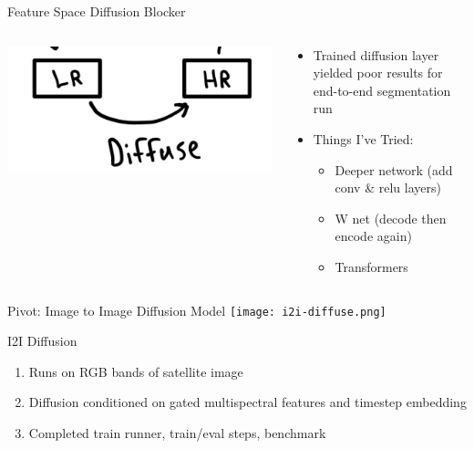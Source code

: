 \begin{frame}{Feature Space Diffusion Blocker}
  \begin{columns}[c]
    \begin{column}{0.48\textwidth}
      \centering
      \includegraphics[width=\linewidth]{images/ls-diffuse.png}
    \end{column}
    \begin{column}{0.48\textwidth}
      \begin{itemize}
        \item Trained diffusion layer yielded poor results for end-to-end segmentation run
        \item Things I've Tried:
        \begin{itemize}
          \item Deeper network (add conv & relu layers)
          \item W net (decode then encode again)
          \item Transformers
        \end{itemize}
      \end{itemize}
    \end{column}
  \end{columns}
\end{frame}

\begin{frame}{Pivot: Image to Image Diffusion Model}
    \centering
    \texttt{[image: i2i-diffuse.png]}
\end{frame}

\begin{frame}{I2I Diffusion}
    \begin{enumerate}
        \item Runs on RGB bands of satellite image
        \item Diffusion conditioned on gated multispectral features and timestep embedding
        \item Completed train runner, train/eval steps, benchmark
    \end{enumerate}
\end{frame}
